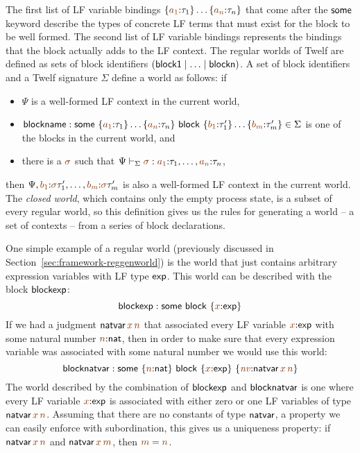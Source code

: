 The first list of LF variable bindings
$\{\lf{a_1}{:}\tau_1\}\ldots\{\lf{a_n}{:}\tau_n\}$ that 
come after the ${\sf some}$ keyword describe the types
of concrete LF terms that must exist for the block to be well formed.
The second list of LF variable bindings represents the bindings that
the block actually adds to the LF context. The regular worlds of 
Twelf are defined as sets of block identifiers 
$({\sf block1} \mid \ldots \mid {\sf blockn})$. A set of block identifiers
and a Twelf signature $\Sigma$ define a world as follows: if
\smallskip
\begin{itemize}
\item $\Psi$ is a well-formed
LF context in the current world, 
\item ${\sf blockname} :
 {\sf some}~\{\lf{a_1}{:}\tau_1\}\ldots\{\lf{a_n}{:}\tau_n\}
~{\sf block}~\{\lf{b_1}{:}\tau'_1\}\ldots\{\lf{b_m}{:}\tau'_m\} \in \Sigma$
 is one of the blocks in the current world, and
\item there is a $\lf{\sigma}$ such that
$\Psi \vdash_\Sigma \lf{\sigma} :
\lf{a_1}{:}\tau_1,\ldots,\lf{a_n}{:}\tau_n$, 
\end{itemize}
\smallskip then $\Psi, \lf{b_1}{:}\lf\sigma\tau'_1,\ldots,
\lf{b_m}{:}\lf\sigma\tau'_m$ is also a well-formed LF context in the
current world. The {\it closed world}, which contains only the empty
process state, is a subset of every regular world, so this definition
gives us the rules for generating a world -- a set of contexts -- from
a series of block declarations.

One simple example of a regular world (previously discussed in
Section~\ref{sec:framework-reggenworld}) is the world that just
contains arbitrary expression variables with LF type ${\sf exp}$. This
world can be described with the block ${\sf blockexp}$:
\[
 {\sf blockexp} : 
 {\sf some}
~{\sf block}~\{{\lf x}{:}{\sf exp}\}
\]
If we had a judgment ${\sf natvar}\,\lf{x}\,\lf{n}$ that associated
every LF variable $\lf{x}{:}{\sf exp}$ with some natural number
$\lf{n}{:}{\sf nat}$, then in order to make sure that every expression
variable was associated with some natural number we would use this
world:
\[
 {\sf blocknatvar} : 
 {\sf some}~\{{\lf n}{:}{\sf nat}\}
~{\sf block}~\{{\lf x}{:}{\sf exp}\}~
               \{\lf{\it nv}{:}{\sf natvar}\,\lf{x}\,\lf{n}\}
\]
The world described by the combination of ${\sf blockexp}$ and ${\sf
  blocknatvar}$ is one where every LF variable $\lf{x}{:}{\sf exp}$
is associated with either zero or one LF variables of type ${\sf
  natvar}\,\lf{x}\,\lf{n}$. Assuming that there are no constants of
type ${\sf natvar}$, a property we can easily enforce with subordination, this
gives us a uniqueness property: if ${\sf natvar}\,\lf{x}\,\lf{n}$ and
${\sf natvar}\,\lf{x}\,\lf{m}$, then $\lf{m} = \lf{n}$. 

